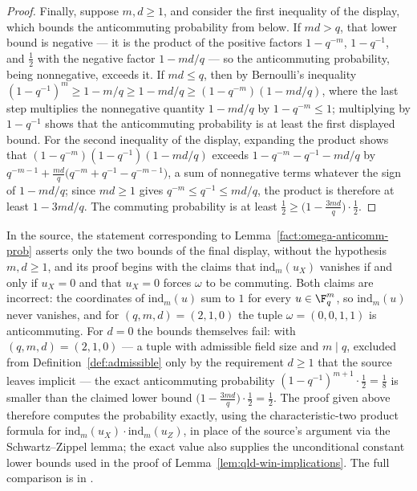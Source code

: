 \begin{proof}
	Finally, suppose $m, d \geq 1$, and consider the first inequality of
	the display, which bounds the anticommuting probability from below.
	If $md > q$, that lower bound is negative --- it is the product of
	the positive factors $1 - q^{-m}$, $1 - q^{-1}$, and $\frac12$ with
	the negative factor $1 - md/q$ --- so the anticommuting probability,
	being nonnegative, exceeds it. If $md \leq q$, then by Bernoulli's
	inequality
	$(1-q^{-1})^{m} \geq 1 - m/q \geq 1 - md/q \geq (1-q^{-m})(1-md/q)$,
	where the last step multiplies the nonnegative quantity $1 - md/q$
	by $1 - q^{-m} \leq 1$; multiplying by $1 - q^{-1}$ shows that the
	anticommuting probability is at least the first displayed bound. For
	the second inequality of the display, expanding the product shows
	that $(1-q^{-m})(1-q^{-1})(1-md/q)$ exceeds
	$1 - q^{-m} - q^{-1} - md/q$ by
	$q^{-m-1} + \frac{md}{q} \big( q^{-m} + q^{-1} - q^{-m-1} \big)$,
	a sum of nonnegative terms whatever the sign of $1 - md/q$; since
	$md \geq 1$ gives $q^{-m} \leq q^{-1} \leq md/q$, the product is
	therefore at least $1 - 3md/q$.
	The commuting probability is at least
	$\frac12 \geq \big(1 - \frac{3md}{q}\big) \cdot \frac12$.
\end{proof}

\begin{remark}
	\label{rem:omega-anticomm-prob-correction}
	In the source, the statement corresponding to
	Lemma~\ref{fact:omega-anticomm-prob} asserts only the two bounds of the
	final display, without the hypothesis $m, d \geq 1$, and its proof
	begins with the claims that $\mathrm{ind}_m(u_X)$ vanishes if and only
	if $u_X = 0$ and that $u_X = 0$ forces $\omega$ to be commuting. Both
	claims are incorrect: the coordinates of $\mathrm{ind}_m(u)$ sum to $1$
	for every $u \in \F_q^m$, so $\mathrm{ind}_m(u)$ never vanishes, and for
	$(q,m,d) = (2,1,0)$ the tuple $\omega = (0,0,1,1)$ is anticommuting.
	For $d = 0$ the bounds themselves fail: with $(q,m,d) = (2,1,0)$ ---
	a tuple with admissible field size and $m \mid q$, excluded from
	Definition~\ref{def:admissible} only by the requirement $d \geq 1$
	that the source leaves implicit --- the exact anticommuting
	probability
	$(1-q^{-1})^{m+1} \cdot \frac12 = \frac18$ is smaller than the claimed
	lower bound $\big(1 - \frac{3md}{q}\big) \cdot \frac12 = \frac12$. The
	proof given above therefore computes the probability exactly, using the
	characteristic-two product formula for
	$\mathrm{ind}_m(u_X) \cdot \mathrm{ind}_m(u_Z)$, in place of the
	source's argument via the Schwartz--Zippel lemma; the exact value also
	supplies the unconditional constant lower bounds used in the proof of
	Lemma~\ref{lem:qld-win-implications}.  The full comparison is in
	\cite{gap:qpbt_anticommuting-probability}.
\end{remark}

